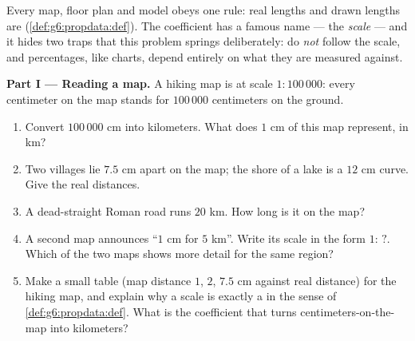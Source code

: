 \begin{problem}
\label{pb:g6:propdata:1}
Every map, floor plan and model obeys one rule: real lengths and
drawn lengths are \emph{}
(\cref{def:g6:propdata:def}). The coefficient has a famous name
--- the \emph{scale} --- and it hides two traps that
this problem springs deliberately:  do \emph{not} follow the
scale, and percentages, like charts, depend entirely on what they
are measured against.

\medskip
\noindent\textbf{Part I --- Reading a map.}
A hiking map is at scale $1:100\,000$: every centimeter on the map
stands for $100\,000$ centimeters on the ground.
\begin{enumerate}
  \item Convert $100\,000$ cm into kilometers. What does $1$ cm
        of this map represent, in km?
  \item Two villages lie $7.5$ cm apart on the map; the shore of
        a lake is a $12$ cm curve. Give the real distances.
  \item A dead-straight Roman road runs $20$ km. How long is it
        on the map?
  \item A second map announces ``$1$ cm for $5$ km''. Write its
        scale in the form $1: \,?$. Which of the two maps shows
        more detail for the same region?
  \item Make a small table (map distance $1$, $2$, $7.5$ cm
        against real distance) for the hiking map, and explain
        why a scale is exactly a  in the sense of
        \cref{def:g6:propdata:def}. What is the coefficient that
        turns centimeters-on-the-map into kilometers?
\end{enumerate}


\end{problem}
